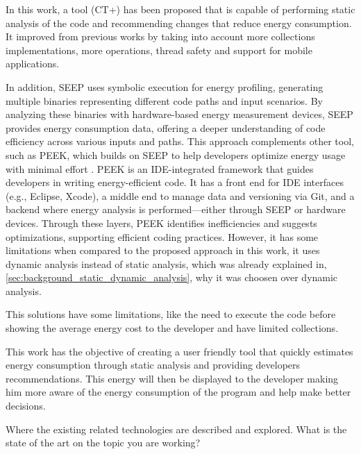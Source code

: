 \documentclass[sigplan]{acmart}
\begin{document}
In this work\cite{8816747}, a tool (CT+) has been proposed that is capable of performing static analysis of the code and recommending changes that reduce energy consumption. It improved from previous works by taking into account more collections implementations, more operations, thread safety and support for mobile applications. 

In addition, SEEP \cite{10.1145/2094091.2094106} uses symbolic execution for energy profiling, generating multiple binaries representing different code paths and input scenarios. By analyzing these binaries with hardware-based energy measurement devices, SEEP provides energy consumption data, offering a deeper understanding of code efficiency across various inputs and paths. This approach complements other tool, such as PEEK, which builds on SEEP to help developers optimize energy usage with minimal effort \cite{187026}. PEEK is an IDE-integrated framework that guides developers in writing energy-efficient code. It has a front end for IDE interfaces (e.g., Eclipse, Xcode), a middle end to manage data and versioning via Git, and a backend where energy analysis is performed—either through SEEP or hardware devices. Through these layers, PEEK identifies inefficiencies and suggests optimizations, supporting efficient coding practices. However, it has some limitations when compared to the proposed approach in this work, it uses dynamic analysis instead of static analysis, which was already explained in, \ref{sec:background_static_dynamic_analysis}, why it was choosen over dynamic analysis.


This solutions have some limitations, like the need to execute the code before showing the average energy cost to the developer and have limited collections.

This work has the objective of creating a user friendly tool that quickly estimates energy consumption through static analysis and providing developers recommendations. This energy will then be displayed to the developer making him more aware of the energy consumption of the program and help make better decisions.




% 

Where the existing related technologies are described and explored. What is the state of the art on the topic you are working? 
\end{document}
